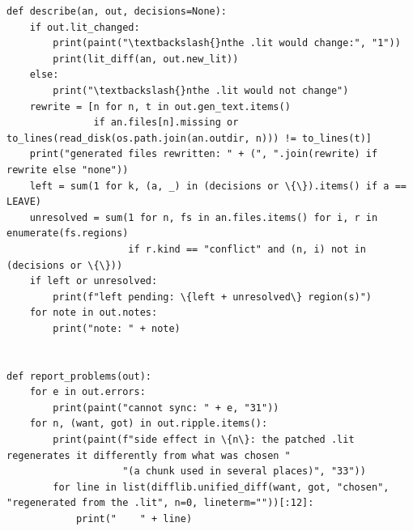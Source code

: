 \documentclass[10pt,a4paper]{article}
\newcounter{chunk}
\begin{document}
\begin{Verbatim}
def describe(an, out, decisions=None):
    if out.lit_changed:
        print(paint("\textbackslash{}nthe .lit would change:", "1"))
        print(lit_diff(an, out.new_lit))
    else:
        print("\textbackslash{}nthe .lit would not change")
    rewrite = [n for n, t in out.gen_text.items()
               if an.files[n].missing or to_lines(read_disk(os.path.join(an.outdir, n))) != to_lines(t)]
    print("generated files rewritten: " + (", ".join(rewrite) if rewrite else "none"))
    left = sum(1 for k, (a, _) in (decisions or \{\}).items() if a == LEAVE)
    unresolved = sum(1 for n, fs in an.files.items() for i, r in enumerate(fs.regions)
                     if r.kind == "conflict" and (n, i) not in (decisions or \{\}))
    if left or unresolved:
        print(f"left pending: \{left + unresolved\} region(s)")
    for note in out.notes:
        print("note: " + note)


def report_problems(out):
    for e in out.errors:
        print(paint("cannot sync: " + e, "31"))
    for n, (want, got) in out.ripple.items():
        print(paint(f"side effect in \{n\}: the patched .lit regenerates it differently from what was chosen "
                    "(a chunk used in several places)", "33"))
        for line in list(difflib.unified_diff(want, got, "chosen", "regenerated from the .lit", n=0, lineterm=""))[:12]:
            print("    " + line)
\end{Verbatim}
\end{document}
